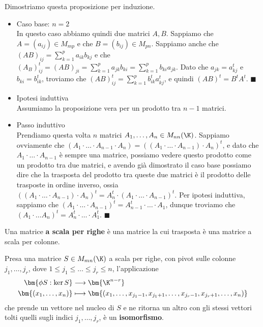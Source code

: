 \documentclass[11pt, a4paper, titlepage, oneside]{scrbook}
\begin{document}
Dimostriamo questa proposizione per induzione.
\begin{itemize}
    \item Caso base: $n = 2$ \\
    In questo caso abbiamo quindi due matrici $A, B$. Sappiamo che $A = (a_{ij}) \in M_{mp}$ e che $B = (b_{ij}) \in M_{pn}$. Sappiamo anche che $(AB)_{ij} = \sum_{k = 1}^p a_{ik} b_{kj}$ e che \mbox{$(A_B)^t_{ij} = (AB)_{ji} = \sum_{k = 1}^p a_{jk} b_{ki} = \sum_{k = 1}^p b_{ki} a_{jk}$}. Dato che $a_{jk} = a_{kj}^t$ e $b_{ki} = b^t_{ik}$, troviamo che $(AB)_{ij}^t = \sum_{k = 1}^p b_{ik}^t a_{kj}^t$, e quindi $(AB)^t = B^t A^t$. $\blacksquare$
    \item Ipotesi induttiva \\
    Assumiamo la proposizione vera per un prodotto tra $n-1$ matrici.
    \item Passo induttivo \\
    Prendiamo questa volta $n$ matrici $A_1, \ldots, A_n \in M_{nn}(\K)$. Sappiamo ovviamente che \mbox{$(A_1 \cdot \ldots \cdot A_{n-1} \cdot A_n) = ((A_1 \cdot \ldots \cdot A_{n-1}) \cdot A_n)^t$}, e dato che $A_1 \cdot \ldots \cdot A_{n-1}$ è sempre una matrice, possiamo vedere questo prodotto come un prodotto tra due matrici, e avendo già dimostrato il caso base possiamo dire che la trasposta del prodotto tra queste due matrici è il prodotto delle trasposte in ordine inverso, ossia \mbox{$((A_1 \cdot \ldots \cdot A_{n-1}) \cdot A_n)^t = A_n^t \cdot (A_1 \cdot \ldots \cdot A_{n-1})^t$}. Per ipotesi induttiva, sappiamo che \mbox{$(A_1 \cdot \ldots \cdot A_{n-1})^t =  A_{n-1}^t \cdot \ldots \cdot A_1$}, dunque troviamo che \mbox{$(A_1 \cdot \ldots A_n)^t = A_n^t \cdot \ldots \cdot A_1^t$.} $\blacksquare$
\end{itemize}

\begin{Definizione}
\label{def-matr-scala-per-righe}
Una matrice \textbf{a scala per righe} è una matrice la cui trasposta è una matrice a scala per colonne.
\end{Definizione}

\begin{Proposizione}[]
\label{propos-dimensione-nucleo-(n-r)}
Presa una matrice $S \in M_{mn}(\K)$ a scala per righe, con pivot sulle colonne $j_1, \ldots, j_r$, dove $1 \leq j_1 \leq \ldots \leq j_r \leq n$, l'applicazione
\begin{align*}
\bm{\phi S: \ker S} &\longrightarrow \bm{\K^{n-r}} \\
\bm{(x_1, \ldots, x_n)} &\longmapsto \bm{(x_1, \ldots, x_{j_1 - 1}, x_{j_1 + 1}, \ldots, x_{j_r - 1}, x_{j_r + 1}, \ldots, x_n)}
\end{align*}
che prende un vettore nel nucleo di $S$ e ne ritorna un altro con gli stessi vettori tolti quelli sugli indici $j_1, \ldots, j_r$, è un \textbf{isomorfismo}. 
\end{Proposizione}
\end{document}
